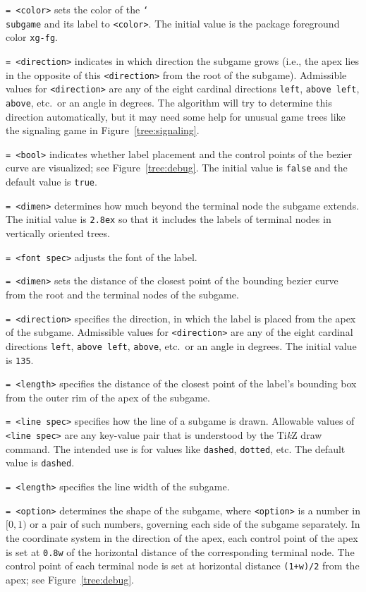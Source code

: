 \documentclass{article}
\newenvironment{desc}{\itemize[leftmargin=50pt]}{\enditemize}
\def\option#1#2{\item[\texttt{#1}] \hskip-1.5pt\texttt{#2}}
\renewcommand{\textbackslash}{\char`\\}
\def\cmd#1{\texttt{\color{cmd}\textbackslash#1}}
\def\TikZ{Ti\emph{k}Z\xspace}
\begin{document}
\begin{desc}
\option{color}{= <color>} sets the color of the \cmd{subgame} and its label to \texttt{<color>}. The initial value is the package foreground color \texttt{xg-fg}.

\option{dir}{= <direction>} indicates in which direction the subgame grows (i.e., the apex lies in the opposite of this \texttt{<direction>} from the root of the subgame). Admissible values for \texttt{<direction>} are any of the eight cardinal directions \texttt{left}, \texttt{above left}, \texttt{above}, etc.\ or an angle in degrees. The algorithm will try to determine this direction automatically, but it may need some help for unusual game trees like the signaling game in Figure~\ref{tree:signaling}. 

\option{debug}{= <bool>} indicates whether label placement and the control points of the bezier curve are visualized; see Figure~\ref{tree:debug}. The initial value is \texttt{false} and the default value is \texttt{true}.

\option{depth}{= <dimen>} determines how much beyond the terminal node the subgame extends. The initial value is \texttt{2.8ex} so that it includes the labels of terminal nodes in vertically oriented trees.

\option{font}{= <font spec>} adjusts the font of the label.

\option{inner sep}{= <dimen>} sets the distance of the closest point of the bounding bezier curve from the root and the terminal nodes of the subgame.

\option{label}{= <direction>} specifies the direction, in which the label is placed from the apex of the subgame. Admissible values for \texttt{<direction>} are any of the eight cardinal directions \texttt{left}, \texttt{above left}, \texttt{above}, etc.\ or an angle in degrees. The initial value is \texttt{135}.

\option{label sep}{= <length>} specifies the distance of the closest point of the label's bounding box from the outer rim of the apex of the subgame.

\option{line}{= <line spec>} specifies how the line of a subgame is drawn. Allowable values of \texttt{<line spec>} are any key-value pair that is understood by the \TikZ draw command. The intended use is for values like \texttt{dashed}, \texttt{dotted}, etc. The default value is \texttt{dashed}.

\option{line width}{= <length>} specifies the line width of the subgame.

\option{w}{= <option>} determines the shape of the subgame, where \texttt{<option>} is a number in $[0, 1)$ or a pair of such numbers, governing each side of the subgame separately. In the coordinate system in the direction of the apex, each control point of the apex is set at \texttt{0.8w} of the horizontal distance of the corresponding terminal node. The control point of each terminal node is set at horizontal distance \texttt{(1+w)/2} from the apex; see Figure~\ref{tree:debug}. 
\end{desc}
\end{document}
